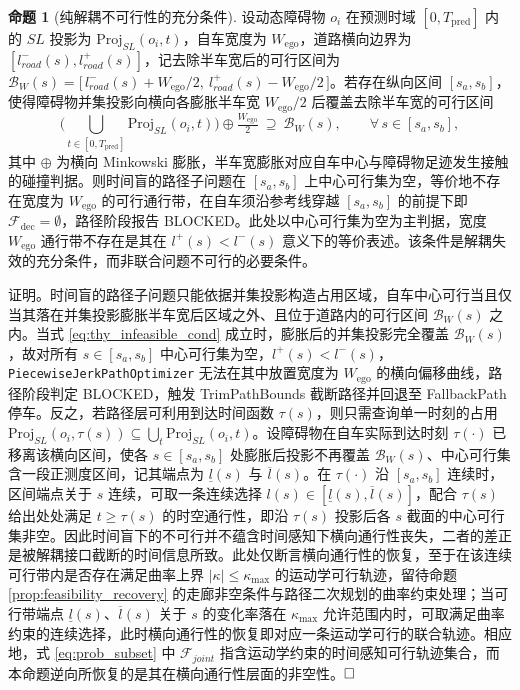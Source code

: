 \documentclass[a4paper,11pt]{ctexart}
\theoremstyle{definition}
\newtheorem{proposition}{命题}[section]
\begin{document}
\begin{proposition}[纯解耦不可行性的充分条件]
\label{prop:decoupled_infeasible}
设动态障碍物 $o_i$ 在预测时域 $[0, T_{\text{pred}}]$ 内的 $SL$ 投影为 $\mathrm{Proj}_{SL}(o_i, t)$，自车宽度为 $W_{\text{ego}}$，道路横向边界为 $[l_{road}^{-}(s), l_{road}^{+}(s)]$，记去除半车宽后的可行区间为 $\mathcal{B}_{W}(s) = \bigl[\, l_{road}^{-}(s) + W_{\text{ego}}/2,\ l_{road}^{+}(s) - W_{\text{ego}}/2 \,\bigr]$。若存在纵向区间 $[s_a, s_b]$，使得障碍物并集投影向横向各膨胀半车宽 $W_{\text{ego}}/2$ 后覆盖去除半车宽的可行区间
\begin{equation}
    \Big(\bigcup_{t \in [0, T_{\text{pred}}]} \mathrm{Proj}_{SL}(o_i, t)\Big) \oplus \tfrac{W_{\text{ego}}}{2}\ \supseteq\ \mathcal{B}_{W}(s), \qquad \forall\, s \in [s_a, s_b],
    \label{eq:thy_infeasible_cond}
\end{equation}
其中 $\oplus$ 为横向 Minkowski 膨胀，半车宽膨胀对应自车中心与障碍物足迹发生接触的碰撞判据。则时间盲的路径子问题在 $[s_a, s_b]$ 上中心可行集为空，等价地不存在宽度为 $W_{\text{ego}}$ 的可行通行带，在自车须沿参考线穿越 $[s_a, s_b]$ 的前提下即 $\mathcal{F}_{\text{dec}} = \emptyset$，路径阶段报告 BLOCKED。此处以中心可行集为空为主判据，宽度 $W_{\text{ego}}$ 通行带不存在是其在 $l^{+}(s) < l^{-}(s)$ 意义下的等价表述。该条件是解耦失效的充分条件，而非联合问题不可行的必要条件。
\end{proposition}

证明。时间盲的路径子问题只能依据并集投影构造占用区域，自车中心可行当且仅当其落在并集投影膨胀半车宽后区域之外、且位于道路内的可行区间 $\mathcal{B}_{W}(s)$ 之内。当式 \eqref{eq:thy_infeasible_cond} 成立时，膨胀后的并集投影完全覆盖 $\mathcal{B}_{W}(s)$，故对所有 $s \in [s_a, s_b]$ 中心可行集为空，$l^{+}(s) < l^{-}(s)$，\texttt{PiecewiseJerkPathOptimizer} 无法在其中放置宽度为 $W_{\text{ego}}$ 的横向偏移曲线，路径阶段判定 BLOCKED，触发 TrimPathBounds 截断路径并回退至 FallbackPath 停车。反之，若路径层可利用到达时间函数 $\tau(s)$，则只需查询单一时刻的占用 $\mathrm{Proj}_{SL}(o_i, \tau(s)) \subseteq \bigcup_t \mathrm{Proj}_{SL}(o_i, t)$。设障碍物在自车实际到达时刻 $\tau(\cdot)$ 已移离该横向区间，使各 $s \in [s_a, s_b]$ 处膨胀后投影不再覆盖 $\mathcal{B}_{W}(s)$、中心可行集含一段正测度区间，记其端点为 $\underline{l}(s)$ 与 $\overline{l}(s)$。在 $\tau(\cdot)$ 沿 $[s_a, s_b]$ 连续时，区间端点关于 $s$ 连续，可取一条连续选择 $l(s) \in [\underline{l}(s), \overline{l}(s)]$，配合 $\tau(s)$ 给出处处满足 $t \geq \tau(s)$ 的时空通行性，即沿 $\tau(s)$ 投影后各 $s$ 截面的中心可行集非空。因此时间盲下的不可行并不蕴含时间感知下横向通行性丧失，二者的差正是被解耦接口截断的时间信息所致。此处仅断言横向通行性的恢复，至于在该连续可行带内是否存在满足曲率上界 $|\kappa| \leq \kappa_{\max}$ 的运动学可行轨迹，留待命题 \ref{prop:feasibility_recovery} 的走廊非空条件与路径二次规划的曲率约束处理；当可行带端点 $\underline{l}(s)$、$\overline{l}(s)$ 关于 $s$ 的变化率落在 $\kappa_{\max}$ 允许范围内时，可取满足曲率约束的连续选择，此时横向通行性的恢复即对应一条运动学可行的联合轨迹。相应地，式 \eqref{eq:prob_subset} 中 $\mathcal{F}_{joint}$ 指含运动学约束的时间感知可行轨迹集合，而本命题逆向所恢复的是其在横向通行性层面的非空性。$\hfill\Box$
\end{document}
